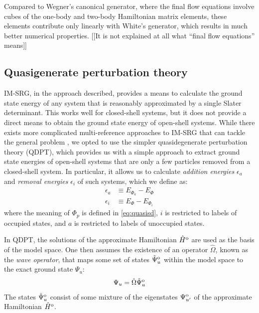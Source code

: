 \documentclass[amsmath, amssymb, aps, floatfix, nofootinbib, preprintnumbers,showpacs, superscriptaddress, twocolumn]{revtex4-1}
\begin{document}
Compared to Wegner's canonical generator, where the final flow equations involve cubes of the one-body and two-body Hamiltonian matrix elements, these elements contribute only linearly with White's generator, which results in much better numerical properties.  [[It is not explained at all what ``final flow equations'' means]]

\subsection{Quasigenerate perturbation theory}
\label{subsec:selfenergy}

IM-SRG, in the approach described, provides a means to calculate the ground state energy of any system that is reasonably approximated by a single Slater determinant.  This works well for closed-shell systems, but it does not provide a direct means to obtain the ground state energy of open-shell systems.  While there exists more complicated multi-reference approaches to IM-SRG that can tackle the general problem \cite{Hergert2016165}, we opted to use the simpler quasidegenerate perturbation theory (QDPT), which provides us with a simple approach to extract ground state energies of open-shell systems that are only a few particles removed from a closed-shell system.  In particular, it allows us to calculate \textit{addition energies} $\epsilon_a$ and \textit{removal energies} $\epsilon_i$ of such systems, which we define as:
\begin{align}
  \epsilon_a &\equiv E_{\Phi_a} - E_{\Phi} \\
  \epsilon_i &\equiv E_{\Phi} - E_{\Phi_i}
\end{align}
where the meaning of $\Phi_p$ is defined in \eqref{eq:quasisd}, $i$ is restricted to labels of occupied states, and $a$ is restricted to labels of unoccupied states.

In QDPT, the solutions of the approximate Hamiltonian $\hat H^{\text o}$ are used as the basis of the model space.  One then assumes the existence of an operator $\hat \Omega$, known as the \textit{wave operator}, that maps some set of states $\tilde \Psi^{\text o}_u$ within the model space to the exact ground state $\Psi_u$:
\begin{align} \label{eq:omega-condition1}
  \Psi_u = \hat \Omega \tilde \Psi^{\text o}_u
\end{align}
The states $\tilde \Psi^{\text o}_u$ consist of some mixture of the eigenstates
$\Psi^{\text o}_{u'}$ of the approximate Hamiltonian $\hat H^{\text o}$.
\end{document}
